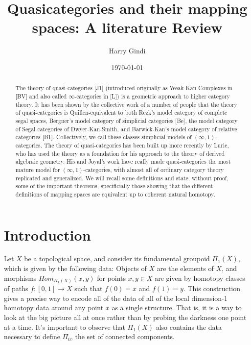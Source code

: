 \documentclass{amsart}
\begin{document}
\theoremstyle{plain}
\newtheorem*{thm}{Theorem}
\newtheorem*{lem}{Lemma}
\newtheorem*{cor}{Corollary}
\newtheorem*{prop}{Proposition}
\theoremstyle{definition}
\newtheorem{defn}{Definition}
\newtheorem{rmk}{Remark}
\title{Quasicategories and their mapping spaces: A literature Review}
\author{Harry Gindi}
\date{\today}
\address{University of Michigan\\ 530 Church Street\\ Ann Arbor, Michigan 48109}
\begin{abstract}
The theory of quasi-categories [J1] (introduced originally as Weak Kan Complexes in [BV] and also called $\infty$-categories in [L]) is a geometric approach to higher category theory.  It has been shown by the collective work of a number of people that the theory of quasi-categories is Quillen-equivalent to both Rezk's model category of complete segal spaces, Bergner's model category of simplicial categories [Be], the model category of Segal categories of Dwyer-Kan-Smith, and Barwick-Kan's model category of relative categories [B1].  Collectively, we call these classes simplicial models of $(\infty,1)$-categories.  The theory of quasi-categories has been built up more recently by Lurie, who has used the theory as a foundation for his approach to the theory of derived algebraic geometry. His and Joyal's work have really made quasi-categories the most mature model for $(\infty,1)$-categories, with almost all of ordinary category theory replicated and generalized. We will recall some definitions and state, without proof, some of the important theorems, specificially those showing that the different definitions of mapping spaces are equivalent up to coherent  natural homotopy.
\end{abstract}
\maketitle
\section{Introduction}
Let $X$ be a topological space, and consider its fundamental groupoid $\Pi_1(X)$, which is given by the following data: Objects of $X$ are the elements of $X$, and morphisms $Hom_{\Pi_1(X)}(x,y)$ for points $x,y\in X$ are given by homotopy classes of paths $f:[0,1]\to X$ such that $f(0)=x$ and $f(1)=y$.  This construction gives a precise way to encode all of the data of all of the local dimension-1 homotopy data around any point $x$ as a single structure. That is, it is a way to look at the big picture all at once rather than by probing the darkness one point at a time. It's important to observe that $\Pi_1(X)$ also contains the data necessary to define $\Pi_0$, the set of connected components. 
\end{document}
